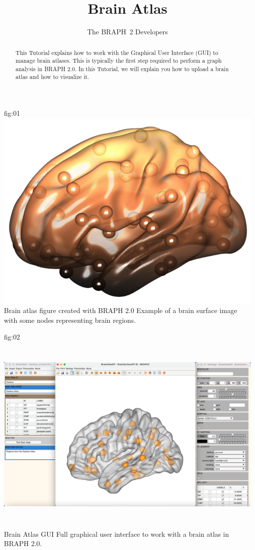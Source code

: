 \documentclass[justified]{tufte-handout}
\title{Brain Atlas}
\author[The BRAPH~2 Developers]{The BRAPH~2 Developers}
\begin{document}
\maketitle
	
	{fig:01}
	{\includegraphics{tut_ba/fig01.png}}
	{Brain atlas figure created with BRAPH 2.0}
	{
	Example of a brain surface image with some nodes representing brain regions.
	}

\begin{abstract}
\noindent
This Tutorial explains how to work with the Graphical User Interface (GUI) to manage brain atlases.
This is typically the first step required to perform a graph analysis in BRAPH 2.0. 
In this Tutorial, we will explain you how to upload a brain atlas and how to visualize it.
\end{abstract}

\tableofcontents

	{fig:02}
	{\includegraphics[height=10cm]{tut_ba/fig02.png}}
	{Brain Atlas GUI}
	{
	Full graphical user interface to work with a brain atlas in BRAPH 2.0. 
	}
\end{document}
